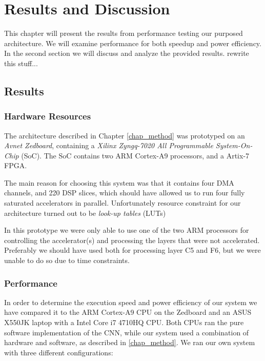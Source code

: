 \chapter{Results and Discussion} \label{chap_results}

This chapter will present the results from performance testing our purposed architecture. We will examine performance for both speedup and power efficiency. In the second section we will discuss and analyze the provided results. rewrite this stuff...

\section{Results}

\subsection{Hardware Resources}

The architecture described in Chapter \ref{chap_method} was prototyped on an \textit{Avnet Zedboard}, containing a \textit{Xilinx Zyngq-7020 All Programmable System-On-Chip} (SoC). The SoC contains two ARM Cortex-A9 processors, and a Artix-7 FPGA. 

The main reason for choosing this system was that it contains four DMA channels, and 220 DSP slices, which should have allowed us to run four fully saturated accelerators in parallel. Unfortunately resource constraint for our architecture turned out to be \textit{look-up tables} (LUTs)

In this prototype we were only able to use one of the two ARM processors for controlling the accelerator(s) and processing the layers that were not accelerated. Preferably we should have used both for processing layer C5 and F6, but we were unable to do so due to time constraints. 


\subsection{Performance}

In order to determine the execution speed and power efficiency of our system we have compared it to the ARM Cortex-A9 CPU on the Zedboard and an ASUS X550JK laptop with a Intel Core i7 4710HQ CPU. Both CPUs ran the pure software implementation of the CNN, while our system used a combination of hardware and software, as described in \ref{chap_method}. We ran our own system with three different configurations:


